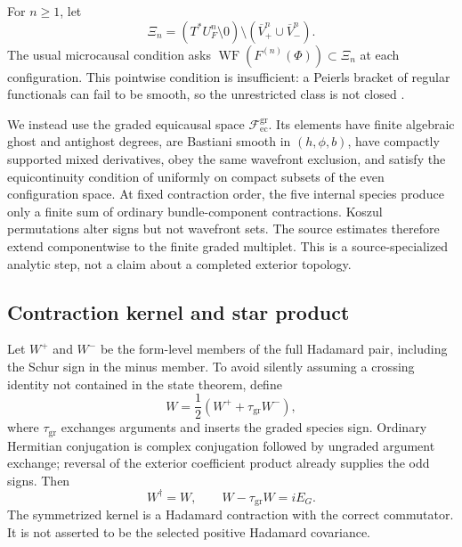 \documentclass[11pt]{article}
\theoremstyle{definition}
\theoremstyle{remark}
\newcommand{\U}{U_{F}}
\newcommand{\WF}{\operatorname{WF}}
\newcommand{\cF}{\mathcal F}
\begin{document}
For $n\geq1$, let
\begin{equation}
 \Xi_n=(T^*\U^n\setminus0)\setminus
 (\overline V_+^n\cup\overline V_-^n).
\end{equation}
The usual microcausal condition asks
$\WF(F^{(n)}(\Phi))\subset\Xi_n$ at each configuration.  This pointwise condition is
insufficient: a Peierls bracket of regular functionals can fail to be smooth, so the
unrestricted class is not closed \cite{HawkinsRejznerVisser2023}.

We instead use the graded equicausal space $\cF_{\mathrm{ec}}^{\mathrm{gr}}$.  Its
elements have finite algebraic ghost and antighost degrees, are Bastiani smooth in
$(h,\phi,b)$, have compactly supported mixed derivatives, obey the same wavefront
exclusion, and satisfy the equicontinuity condition of
\cite{HawkinsRejznerVisser2023} uniformly on compact subsets of the even
configuration space.  At fixed contraction order, the five internal species produce
only a finite sum of ordinary bundle-component contractions.  Koszul permutations
alter signs but not wavefront sets.  The source estimates therefore extend
componentwise to the finite graded multiplet.  This is a source-specialized analytic
step, not a claim about a completed exterior topology.

\subsection{Contraction kernel and star product}

Let $W^+$ and $W^-$ be the form-level members of the full Hadamard pair, including the
Schur sign in the minus member.  To avoid silently assuming a crossing identity not
contained in the state theorem, define
\begin{equation}
 W=\frac12\left(W^++\tau_{\mathrm{gr}}W^-\right),
 \label{eq:Wsym}
\end{equation}
where $\tau_{\mathrm{gr}}$ exchanges arguments and inserts the graded species sign.
Ordinary Hermitian conjugation is complex conjugation followed by ungraded argument
exchange; reversal of the exterior coefficient product already supplies the odd
signs.  Then
\begin{equation}
 W^\dagger=W,
 \qquad W-\tau_{\mathrm{gr}}W=iE_G.
 \label{eq:Wproperties}
\end{equation}
The symmetrized kernel is a Hadamard contraction with the correct commutator.  It is
not asserted to be the selected positive Hadamard covariance.
\end{document}
